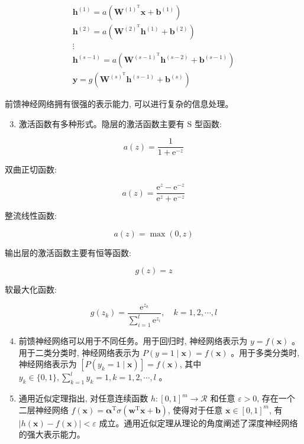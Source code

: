 \documentclass[10pt]{article}
\begin{document}
\begin{CJK*}{UTF8}{bsmi}
$$
\begin{gathered}
\boldsymbol{h}^{(1)}=a\left(\boldsymbol{W}^{(1)^{\mathrm{T}}} \boldsymbol{x}+\boldsymbol{b}^{(1)}\right) \\
\boldsymbol{h}^{(2)}=a\left(\boldsymbol{W}^{(2)^{\mathrm{T}}} \boldsymbol{h}^{(1)}+\boldsymbol{b}^{(2)}\right) \\
\vdots \\
\boldsymbol{h}^{(s-1)}=a\left(\boldsymbol{W}^{(s-1)^{\mathrm{T}}} \boldsymbol{h}^{(s-2)}+\boldsymbol{b}^{(s-1)}\right) \\
\boldsymbol{y}=g\left(\boldsymbol{W}^{(s)^{\mathrm{T}}} \boldsymbol{h}^{(s-1)}+\boldsymbol{b}^{(s)}\right)
\end{gathered}
$$

前馈神经网络拥有很强的表示能力, 可以进行复杂的信息处理。

\begin{enumerate}
  \setcounter{enumi}{2}
  \item 激活函数有多种形式。隐层的激活函数主要有 $\mathrm{S}$ 型函数:
\end{enumerate}

$$
a(z)=\frac{1}{1+\mathrm{e}^{-z}}
$$

双曲正切函数:

$$
a(z)=\frac{\mathrm{e}^{z}-\mathrm{e}^{-z}}{\mathrm{e}^{z}+\mathrm{e}^{-z}}
$$

整流线性函数:

$$
a(z)=\max (0, z)
$$

输出层的激活函数主要有恒等函数:

$$
g(z)=z
$$

软最大化函数:

$$
g\left(z_{k}\right)=\frac{\mathrm{e}^{z_{k}}}{\sum_{i=1}^{l} \mathrm{e}^{z_{i}}}, \quad k=1,2, \cdots, l
$$

\begin{enumerate}
  \setcounter{enumi}{3}
  \item 前馈神经网络可以用于不同任务。用于回归时, 神经网络表示为 $y=f(\boldsymbol{x})$ 。用于二类分类时, 神经网络表示为 $P(y=1 \mid \boldsymbol{x})=f(\boldsymbol{x})$ 。用于多类分类时, 神经网络表示为 $\left[P\left(y_{k}=1 \mid \boldsymbol{x}\right)\right]=f(\boldsymbol{x})$, 其中 $y_{k} \in\{0,1\}, \sum_{k=1}^{l} y_{k}=1, k=1,2, \cdots, l$ 。

  \item 通用近似定理指出, 对任意连续函数 $h:[0,1]^{m} \rightarrow \mathcal{R}$ 和任意 $\varepsilon>0$, 存在一个二层神经网络 $f(\boldsymbol{x})=\boldsymbol{\alpha}^{\mathrm{T}} \sigma\left(\boldsymbol{w}^{\mathrm{T}} \boldsymbol{x}+\boldsymbol{b}\right)$, 使得对于任意 $\boldsymbol{x} \in[0,1]^{m}$, 有 $|h(\boldsymbol{x})-f(\boldsymbol{x})|<\varepsilon$ 成立。通用近似定理从理论的角度阐述了深度神经网络的强大表示能力。


\end{enumerate}
\end{CJK*}
\end{document}
